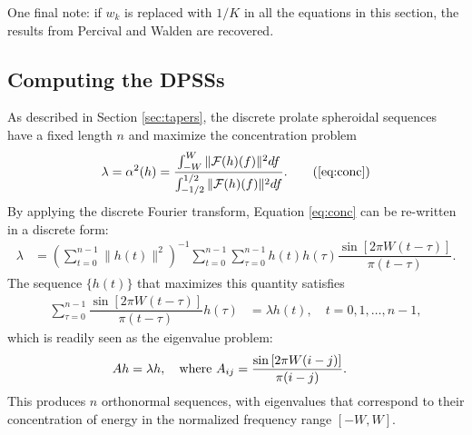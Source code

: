 One final note: if $w_k$ is replaced with $1/K$ in all the equations in this section, the results from Percival and Walden are recovered.

\pagebreak

\subsection{Computing the DPSSs \label{sec:dpsscalc}}

As described in Section \ref{sec:tapers}, the discrete prolate spheroidal sequences have a fixed length $n$ and maximize the concentration problem
\begin{align*}
    \lambda = \alpha^2(h) = \dfrac{\int_{-W}^W \|\mathcal{F}(h)(f)\|^2df}{\int_{-1/2}^{1/2} \|\mathcal{F}(h)(f)\|^2 df}. \tag{\ref{eq:conc}}
\end{align*}
By applying the discrete Fourier transform, Equation \eqref{eq:conc} can be re-written in a discrete form:
\begin{align*}
    \lambda & = \left(\sum_{t=0}^{n-1}\|h(t)\|^2\right)^{-1}\sum_{t=0}^{n-1}\sum_{\tau=0}^{n-1} h(t)h(\tau)\dfrac{\sin\left[2\pi W(t-\tau)\right]}{\pi(t-\tau)}.
\end{align*}
The sequence $\{h(t)\}$ that maximizes this quantity satisfies
\begin{align}
    \sum_{\tau=0}^{n-1} \dfrac{\sin\left[2\pi W(t-\tau)\right]}{\pi(t-\tau)} h(\tau) & = \lambda h(t), \quad t=0,1,\ldots,n-1,
\end{align}
which is readily seen as the eigenvalue problem:
\begin{align}
    A h & = \lambda h, \quad \text{where }A_{ij} = \dfrac{\sin\left[2\pi W(i-j)\right]}{\pi(i-j)}. \label{eq:eigen}\index{discrete prolate spheroidal sequence (DPSS)!eigenvalue problem}\index{eigenvalues}\index{eigenvectors}
\end{align}
This produces $n$ orthonormal sequences, with eigenvalues that correspond to their concentration of energy in the normalized frequency range $[-W,W]$.  

